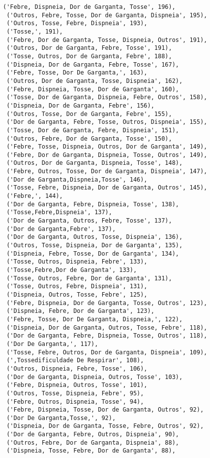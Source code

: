 \documentclass[11pt]{article}
\begin{document}
\begin{tcolorbox}[breakable, size=fbox, boxrule=.5pt, pad at break*=1mm, opacityfill=0]
\begin{Verbatim}[commandchars=\\\{\}]
 ('Febre, Dispneia, Dor de Garganta, Tosse', 196),
 ('Outros, Febre, Tosse, Dor de Garganta, Dispneia', 195),
 ('Outros, Tosse, Febre, Dispneia', 193),
 ('Tosse,', 191),
 ('Febre, Dor de Garganta, Tosse, Dispneia, Outros', 191),
 ('Outros, Dor de Garganta, Febre, Tosse', 191),
 ('Tosse, Outros, Dor de Garganta, Febre', 188),
 ('Dispneia, Dor de Garganta, Febre, Tosse', 167),
 ('Febre, Tosse, Dor De Garganta,', 163),
 ('Outros, Dor de Garganta, Tosse, Dispneia', 162),
 ('Febre, Dispneia, Tosse, Dor de Garganta', 160),
 ('Tosse, Dor de Garganta, Dispneia, Febre, Outros', 158),
 ('Dispneia, Dor de Garganta, Febre', 156),
 ('Outros, Tosse, Dor de Garganta, Febre', 155),
 ('Dor de Garganta, Febre, Tosse, Outros, Dispneia', 155),
 ('Tosse, Dor de Garganta, Febre, Dispneia', 151),
 ('Outros, Febre, Dor de Garganta, Tosse', 150),
 ('Febre, Tosse, Dispneia, Outros, Dor de Garganta', 149),
 ('Febre, Dor de Garganta, Dispneia, Tosse, Outros', 149),
 ('Outros, Dor de Garganta, Dispneia, Tosse', 148),
 ('Febre, Outros, Tosse, Dor de Garganta, Dispneia', 147),
 ('Dor de Garganta,Dispneia,Tosse', 146),
 ('Tosse, Febre, Dispneia, Dor de Garganta, Outros', 145),
 ('Febre,', 144),
 ('Dor de Garganta, Febre, Dispneia, Tosse', 138),
 ('Tosse,Febre,Dispneia', 137),
 ('Dor de Garganta, Outros, Febre, Tosse', 137),
 ('Dor de Garganta,Febre', 137),
 ('Dor de Garganta, Outros, Tosse, Dispneia', 136),
 ('Outros, Tosse, Dispneia, Dor de Garganta', 135),
 ('Dispneia, Febre, Tosse, Dor de Garganta', 134),
 ('Tosse, Outros, Dispneia, Febre', 133),
 ('Tosse,Febre,Dor de Garganta', 133),
 ('Tosse, Outros, Febre, Dor de Garganta', 131),
 ('Tosse, Outros, Febre, Dispneia', 131),
 ('Dispneia, Outros, Tosse, Febre', 125),
 ('Febre, Dispneia, Dor de Garganta, Tosse, Outros', 123),
 ('Dispneia, Febre, Dor de Garganta', 123),
 ('Febre, Tosse, Dor De Garganta, Dispneia,', 122),
 ('Dispneia, Dor de Garganta, Outros, Tosse, Febre', 118),
 ('Dor de Garganta, Febre, Dispneia, Tosse, Outros', 118),
 ('Dor De Garganta,', 117),
 ('Tosse, Febre, Outros, Dor de Garganta, Dispneia', 109),
 (',Tossedificuldade De Respirar', 108),
 ('Outros, Dispneia, Febre, Tosse', 106),
 ('Dor de Garganta, Dispneia, Outros, Tosse', 103),
 ('Febre, Dispneia, Outros, Tosse', 101),
 ('Outros, Tosse, Dispneia, Febre', 95),
 ('Febre, Outros, Dispneia, Tosse', 94),
 ('Febre, Dispneia, Tosse, Dor de Garganta, Outros', 92),
 ('Dor De Garganta,Tosse,', 92),
 ('Dispneia, Dor de Garganta, Tosse, Febre, Outros', 92),
 ('Dor de Garganta, Febre, Outros, Dispneia', 90),
 ('Outros, Febre, Dor de Garganta, Dispneia', 88),
 ('Dispneia, Tosse, Febre, Dor de Garganta', 88),

\end{Verbatim}
\end{tcolorbox}
\end{document}
